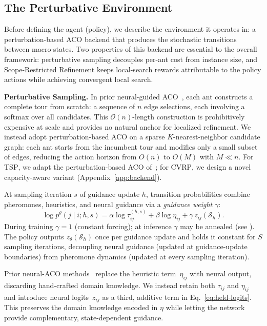 \documentclass[sigconf]{acmart}
\newcommand{\TSP}{\textsc{TSP}}
\newcommand{\CVRP}{\textsc{CVRP}}
\begin{document}
\subsection{The Perturbative Environment}
\label{sec:backend}

Before defining the agent (policy), we describe the environment it operates in: a perturbation-based ACO backend that produces the stochastic transitions between macro-states.
Two properties of this backend are essential to the overall framework: perturbative sampling decouples per-ant cost from instance size, and Scope-Restricted Refinement keeps local-search rewards attributable to the policy actions while achieving convergent local search.

\smallskip\noindent\textbf{Perturbative Sampling.}
In prior neural-guided ACO~\cite{deepaco,gfacs,gtgaco}, each ant constructs a complete tour from scratch: a sequence of $n$ edge selections, each involving a softmax over all candidates.
This $\mathcal{O}(n)$-length construction is prohibitively expensive at scale and provides no natural anchor for localized refinement.
We instead adopt perturbation-based ACO on a sparse $K$-nearest-neighbor candidate graph: each ant starts from the incumbent tour and modifies only a small subset of edges, reducing the action horizon from $O(n)$ to $O(M)$ with $M \ll n$.
For \TSP{}, we adapt the perturbation-based ACO of~\cite{faco}; for \CVRP{}, we design a novel capacity-aware variant (Appendix~\ref{app:backend}).

At sampling iteration $s$ of guidance update $h$, transition probabilities combine pheromones, heuristics, and neural guidance via a \emph{guidance weight} $\gamma$:
\begin{equation}
\log p^\theta(j \mid i; h, s) = \alpha \log \tau^{(h,s)}_{ij} + \beta \log \eta_{ij} + \gamma\, z_{ij}(\mathcal{S}_h).
\label{eq:held-logits}
\end{equation}
During training $\gamma{=}1$ (constant forcing); at inference $\gamma$ may be annealed (see ).
The policy outputs $z_\theta(\mathcal{S}_h)$ once per guidance update and holds it constant for $S$ sampling iterations, decoupling neural guidance (updated at guidance-update boundaries) from pheromone dynamics (updated at every sampling iteration).

Prior neural-ACO methods~\cite{deepaco,gfacs,gtgaco} replace the heuristic term~$\eta_{ij}$ with neural output, discarding hand-crafted domain knowledge.
We instead retain both $\tau_{ij}$ and $\eta_{ij}$ and introduce neural logits~$z_{ij}$ as a third, additive term in Eq.~\eqref{eq:held-logits}.
This preserves the domain knowledge encoded in $\eta$ while letting the network provide complementary, state-dependent guidance.
\end{document}
